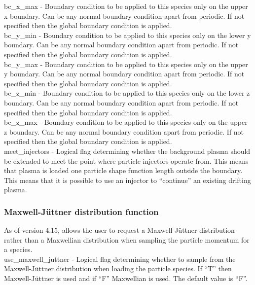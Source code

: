 {\emphtext bc\_x\_max} - Boundary condition to be applied to this species only
on the upper x boundary. Can be any normal boundary condition apart
from periodic. If not specified then the global boundary condition is applied.\\

{\emphtext bc\_y\_min} - Boundary condition to be applied to this species only
on the lower y boundary. Can be any normal boundary condition apart
from periodic. If not specified then the global boundary condition is applied.\\

{\emphtext bc\_y\_max} - Boundary condition to be applied to this species only
on the upper y boundary. Can be any normal boundary condition apart
from periodic. If not specified then the global boundary condition is applied.\\

{\emphtext bc\_z\_min} - Boundary condition to be applied to this species only
on the lower z boundary. Can be any normal boundary condition apart
from periodic. If not specified then the global boundary condition is applied.\\

{\emphtext bc\_z\_max} - Boundary condition to be applied to this species only
on the upper z boundary. Can be any normal boundary condition apart
from periodic. If not specified then the global boundary condition is applied.\\

{\emphtext meet\_injectors} - Logical flag determining whether the background
plasma
should be extended to meet the point where particle injectors operate from.
This means that plasma is loaded one particle shape function length outside the
boundary. This means that it is possible to use an injector to ``continue'' an
existing drifting plasma. 

\subsubsection{Maxwell-J\"uttner distribution function}
\label{sec:maxwell_juttner}

As of version 4.15, \EPOCH allows the user to request a Maxwell-J\"uttner
distribution rather than a Maxwellian distribution when sampling the particle
momentum for a species.\\

{\emphtext use\_maxwell\_juttner} - Logical flag determining whether to sample
  from the Maxwell-J\"uttner distribution when loading the particle species.
  If ``T'' then Maxwell-J\"uttner is used and if ``F'' Maxwellian is used.
  The default value is ``F''.\\


